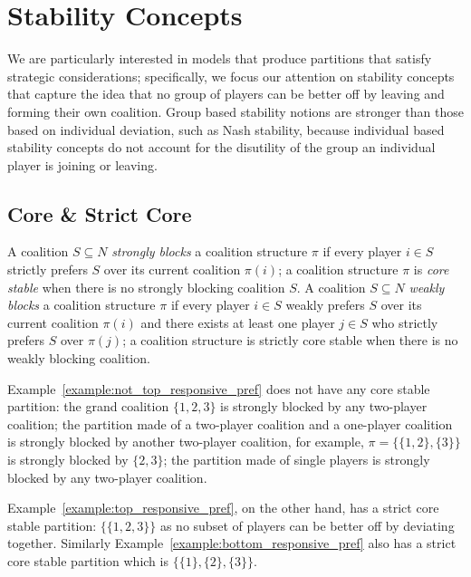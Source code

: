 \section{Stability Concepts}
\label{sec:stability_concepts}
We are particularly interested in models that produce partitions that satisfy
strategic considerations; specifically, we focus our attention on stability
concepts that capture the idea that no group of players can be better off by
leaving and forming their own coalition.
Group based stability notions are stronger than those based on individual deviation,
such as Nash stability, because individual based stability concepts do not account
for the disutility of the group an individual player is joining or leaving.

\subsection{Core \& Strict Core}
\label{subsec:core_strict_core}
A coalition $S \subseteq N$ \textit{strongly blocks} a coalition structure $\pi$
if every player $i \in S$ strictly prefers $S$ over its current coalition $\pi(i)$;
a coalition structure $\pi$ is \textit{core stable} when there is no strongly
blocking coalition $S$.
A coalition $S \subseteq N$ \textit{weakly blocks} a coalition structure $\pi$
if every player $i \in S$ weakly prefers $S$ over its current coalition $\pi(i)$
and there exists at least one player $j \in S$ who strictly prefers $S$
over $\pi(j)$; a coalition structure is strictly core stable when there is no
weakly blocking coalition.

Example~\ref{example:not_top_responsive_pref} does not have any core stable
partition: the grand coalition $\{1, 2, 3\}$ is strongly blocked by any two-player
coalition; the partition made of a two-player coalition and a one-player
coalition is strongly blocked by another two-player coalition, for example,
$\pi = \{\{1, 2\}, \{3\}\}$ is strongly blocked by $\{2, 3\}$; the partition made
of single players is strongly blocked by any two-player coalition.

Example~\ref{example:top_responsive_pref}, on the other hand, has a strict core
stable partition: $\{\{1, 2, 3\}\}$ as no subset of players can be better off by
deviating together.
Similarly Example~\ref{example:bottom_responsive_pref} also has a strict core
stable partition which is $\{\{1\}, \{2\}, \{3\}\}$.

